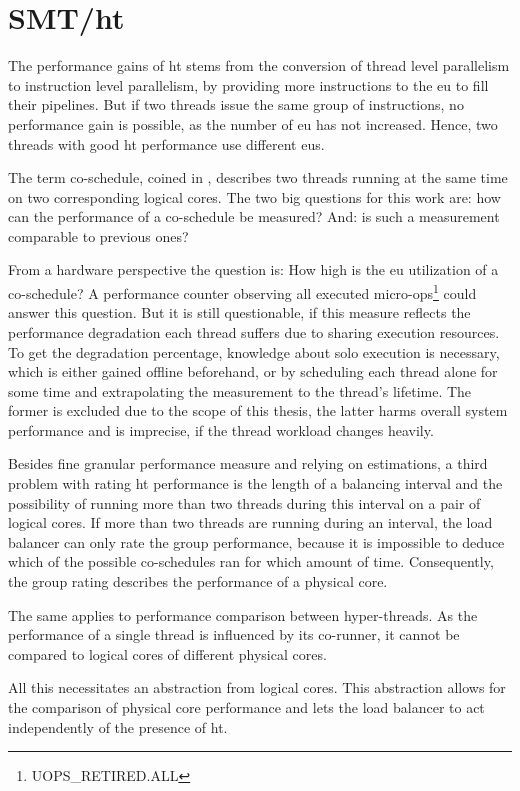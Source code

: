 \section{SMT/\gls{ht}}
\label{design:smt}


The performance gains of \gls{ht} stems from the conversion of thread level
parallelism to instruction level parallelism, by providing more instructions to
the \gls{eu} to fill their pipelines.
But if two threads issue the same group of instructions, no performance gain is
possible, as the number of \gls{eu} has not increased.
Hence, two threads with good \gls{ht} performance use different \gls{eu}s.

The term co-schedule, coined in \cite{snavely_symbiotic_2000}, describes two
threads running at the same time on two corresponding logical cores.
The two big questions for this work are: how can the performance of a co-schedule be
measured? And: is such a measurement comparable to previous ones?

From a hardware perspective the question is: How high is the \gls{eu}
utilization of a co-schedule?
A performance counter observing all executed
micro-ops\footnote{UOPS\_RETIRED.ALL} could answer this question.
But it is still questionable, if this measure reflects the performance
degradation each thread suffers due to sharing execution resources.
To get the degradation percentage, knowledge about solo execution is necessary,
which is either gained offline beforehand, or by scheduling each thread alone
for some time and extrapolating the measurement to the thread's lifetime.
The former is excluded due to the scope of this thesis, the latter harms
overall system performance and is imprecise, if the thread workload changes
heavily.

Besides fine granular performance measure and relying on estimations, a third
problem with rating \gls{ht} performance is the length of a balancing interval
and the possibility of running more than two threads during this interval on a
pair of logical cores.
If more than two threads are running during an interval, the load balancer can
only rate the group performance, because it is impossible to deduce which
of the possible co-schedules ran for which amount of time.
Consequently, the group rating describes the performance of a physical core.

The same applies to performance comparison between hyper-threads. As the
performance of a single thread is influenced by its co-runner, it cannot be
compared to logical cores of different physical cores.

All this necessitates an abstraction from logical cores.
This abstraction allows for the comparison of physical core performance and
lets the load balancer to act independently of the presence of \gls{ht}.
